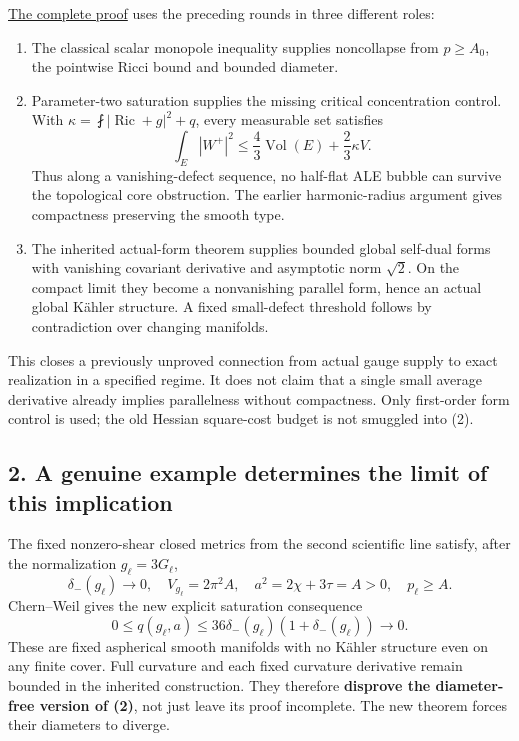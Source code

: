 \documentclass[
  11pt,
]{article}
\providecommand{\tightlist}{%
  \setlength{\itemsep}{0pt}\setlength{\parskip}{0pt}}
\begin{document}
\href{20260923_gauge_saturation_ke.md}{The complete proof} uses the
preceding rounds in three different roles:

\begin{enumerate}
\def\labelenumi{\arabic{enumi}.}
\tightlist
\item
  The classical scalar monopole inequality supplies noncollapse from
  \(p\ge A_0\), the pointwise Ricci bound and bounded diameter.
\item
  Parameter-two saturation supplies the missing critical concentration
  control. With \(\kappa=\fint|\operatorname{Ric}+g|^2+q\), every
  measurable set satisfies \[
  \int_E|W^+|^2\le\frac43\operatorname{Vol}(E)
                             +\frac23\kappa V.             \tag{3}
  \] Thus along a vanishing-defect sequence, no half-flat ALE bubble can
  survive the topological core obstruction. The earlier harmonic-radius
  argument gives compactness preserving the smooth type.
\item
  The inherited actual-form theorem supplies bounded global self-dual
  forms with vanishing covariant derivative and asymptotic norm
  \(\sqrt2\). On the compact limit they become a nonvanishing parallel
  form, hence an actual global Kähler structure. A fixed small-defect
  threshold follows by contradiction over changing manifolds.
\end{enumerate}

This closes a previously unproved connection from actual gauge supply to
exact realization in a specified regime. It does not claim that a single
small average derivative already implies parallelness without
compactness. Only first-order form control is used; the old Hessian
square-cost budget is not smuggled into (2).

\hypertarget{a-genuine-example-determines-the-limit-of-this-implication}{%
\subsection{2. A genuine example determines the limit of this
implication}\label{a-genuine-example-determines-the-limit-of-this-implication}}

The fixed nonzero-shear closed metrics from the second scientific line
satisfy, after the normalization \(g_\ell=3G_\ell\), \[
 \delta_-(g_\ell)\to0,
 \quad V_{g_\ell}=2\pi^2A,
 \quad a^2=2\chi+3\tau=A>0,
 \quad p_\ell\ge A.
\] Chern--Weil gives the new explicit saturation consequence \[
                 0\le q(g_\ell,a)
                         \le36\delta_-(g_\ell)(1+\delta_-(g_\ell))
                         \longrightarrow0.                 \tag{4}
\] These are fixed aspherical smooth manifolds with no Kähler structure
even on any finite cover. Full curvature and each fixed curvature
derivative remain bounded in the inherited construction. They therefore
\textbf{disprove the diameter-free version of (2)}, not just leave its
proof incomplete. The new theorem forces their diameters to diverge.
\end{document}
